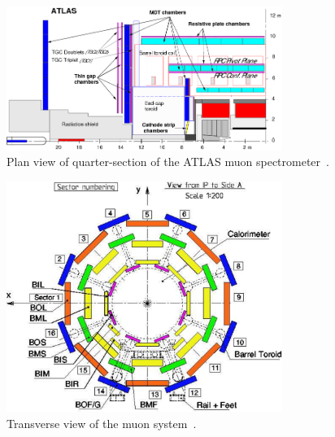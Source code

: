 \begin{figure}[tbhp]
  \centering
    \includegraphics[width=0.80\textwidth]{PartDetector/Diagrams/Muon_section.png}
    \caption[Plan view of quarter-section of the ATLAS muon spectrometer.]{Plan view of quarter-section of the ATLAS muon spectrometer~\cite{Detector:MuonSystemSideView}.}\label{fig:DetectorMuonOverview}
\end{figure}

\begin{figure}[htbp]
  \centering
    \includegraphics[width=0.80\textwidth]{PartDetector/Diagrams/Muon_sector_numbering.pdf}
    \caption[Transverse view of the muon system.]{Transverse view of the muon system~\cite{Detector:ATLASExperimentGeneral}.}\label{fig:DetectorTransverse}
\end{figure}

